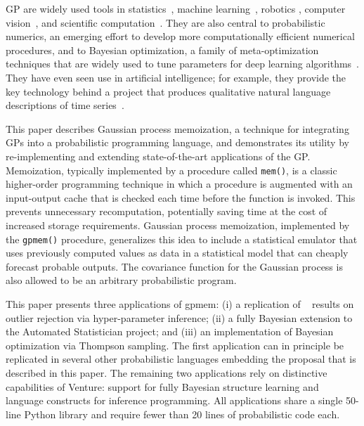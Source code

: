 \ac{GP} are widely used tools in statistics~\citep{barry1986nonparametric}, machine learning~\citep{neal1995bayesian,williams1998bayesian,kuss2005assessing,rasmussen2006gaussian,damianou2013deep}, robotics \citep{ferris2006gaussian}, computer vision~\citep{kemmler2013one}, and scientific computation~\citep{kennedy2001bayesian,schneider2008simulations,kwan2013cosmic}.
They are also central to probabilistic numerics, an emerging effort to develop more computationally efficient numerical procedures, and to Bayesian optimization, a family of meta-optimization techniques that are widely used to tune parameters for deep learning algorithms~\citep{snoek2012practical,gelbart2014bayesian}. They have even seen use in artificial intelligence; for example, they provide the key technology behind a project that produces qualitative natural language descriptions of time series~\citep{duvenaud2013structure,lloyd2014automatic}.

This paper describes Gaussian process memoization, a technique for integrating \ac{GP}s into a probabilistic programming language, and demonstrates its utility by re-implementing and extending state-of-the-art applications of the GP. Memoization, typically implemented by a procedure called {\tt mem()}, is a classic higher-order programming technique in which a procedure is augmented with an input-output cache that is checked each time before the function is invoked. This prevents unnecessary recomputation, potentially saving time at the cost of increased storage requirements. Gaussian process memoization, implemented by the {\tt gpmem()} procedure, generalizes this idea to include a statistical emulator that uses previously computed values as data in a statistical model that can cheaply forecast probable outputs. The covariance function for the Gaussian process is also allowed to be an arbitrary probabilistic program.

This paper presents three applications of gpmem: (i) a replication of ~\citep{neal1997monte} results on outlier rejection via hyper-parameter inference; (ii) a fully Bayesian extension to the Automated Statistician project; and (iii) an implementation of Bayesian optimization via Thompson sampling. The first application can in principle be replicated in several other probabilistic languages embedding the proposal that is described in this paper. The remaining two applications rely on distinctive capabilities of Venture: support for fully Bayesian structure learning and language constructs for inference programming. All applications share a single 50-line Python library and require fewer than 20 lines of probabilistic code each.


